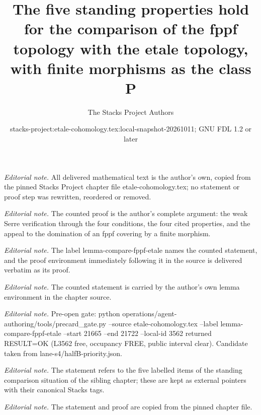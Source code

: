 \documentclass[10pt,a4paper]{amsart}
\title{The five standing properties hold for the comparison of the fppf topology with the etale topology, with finite morphisms as the class P}
\author{The Stacks Project Authors}
\date{stacks-project:etale-cohomology.tex:local-snapshot-20261011; GNU FDL 1.2 or later}
\theoremstyle{plain}
\theoremstyle{definition}
\theoremstyle{remark}
\numberwithin{equation}{subsection}
\begin{document}
\maketitle
\noindent\textit{Editorial note.} All delivered mathematical text is the author's own, copied from the pinned Stacks Project chapter file etale-cohomology.tex; no statement or proof step was rewritten, reordered or removed.\par\medskip
\noindent\textit{Editorial note.} The counted proof is the author's complete argument: the weak Serre verification through the four conditions, the four cited properties, and the appeal to the domination of an fppf covering by a finite morphism.\par\medskip
\noindent\textit{Editorial note.} The label lemma-compare-fppf-etale names the counted statement, and the proof environment immediately following it in the source is delivered verbatim as its proof.\par\medskip
\noindent\textit{Editorial note.} The counted statement is carried by the author's own lemma environment in the chapter source.\par\medskip
\noindent\textit{Editorial note.} Pre-open gate: python operations/agent-authoring/tools/precard\_gate.py --source etale-cohomology.tex --label lemma-compare-fppf-etale --start 21665 --end 21722 --local-id 3562 returned RESULT=OK (L3562 free, occupancy FREE, public interval clear). Candidate taken from lane-s4/halfB-priority.json.\par\medskip
\noindent\textit{Editorial note.} The statement refers to the five labelled items of the standing comparison situation of the sibling chapter; these are kept as external pointers with their canonical Stacks tags.\par\medskip
\noindent\textit{Editorial note.} The statement and proof are copied from the pinned chapter file.\par\medskip
\end{document}
